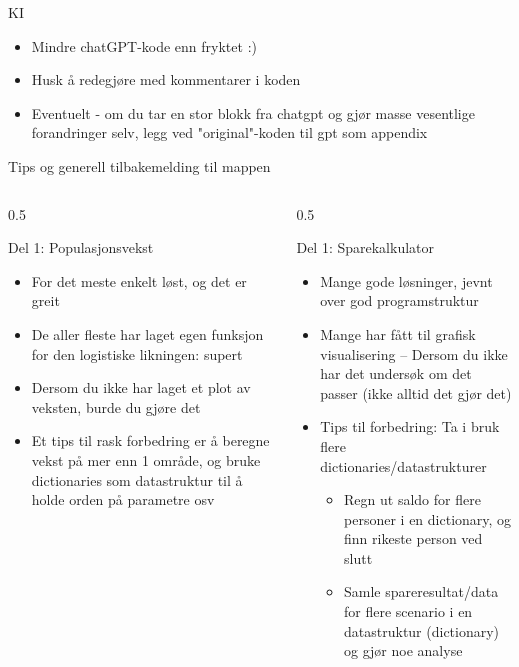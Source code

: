 \documentclass[aspectratio=169]{beamer}
\begin{document}
\begin{frame}{KI}
   \begin{itemize}
      \item {Mindre chatGPT-kode enn fryktet :)}
      \item {Husk å redegjøre med kommentarer i koden}
      \item {Eventuelt - om du tar en stor blokk fra chatgpt og gjør masse vesentlige forandringer selv, legg ved "original"-koden til gpt som appendix}
   \end{itemize}
\end{frame}


\begin{frame}{Tips og generell tilbakemelding til mappen}
   \footnotesize
   \begin{columns}
      \begin{column}{0.5\textwidth}
         \begin{block}{Del 1: Populasjonsvekst}
            \begin{itemize}
               \item {For det meste enkelt løst, og det er greit}
               \item {De aller fleste har laget egen funksjon for den logistiske likningen: supert}
               \item {Dersom du ikke har laget et plot av veksten, burde du gjøre det}
               \item {Et tips til rask forbedring er å beregne vekst på mer enn 1 område, og bruke dictionaries som datastruktur til å holde orden på parametre osv}
            \end{itemize}
         \end{block}
      \end{column}
      \begin{column}{0.5\textwidth}
         \begin{block}{Del 1: Sparekalkulator}
            \begin{itemize}
            \item {Mange gode løsninger, jevnt over god programstruktur}
            \item {Mange har fått til grafisk visualisering -- Dersom du ikke har det undersøk om det passer (ikke alltid det gjør det)}
            \item {Tips til forbedring: Ta i bruk flere dictionaries/datastrukturer}
               \begin{itemize}
                  \item {Regn ut saldo for flere personer i en dictionary, og finn rikeste person ved slutt}
                  \item {Samle spareresultat/data for flere scenario i en datastruktur (dictionary) og gjør noe analyse}
               \end{itemize}
            \end{itemize}
         \end{block}
      \end{column}
   \end{columns}
\end{frame}
\end{document}
